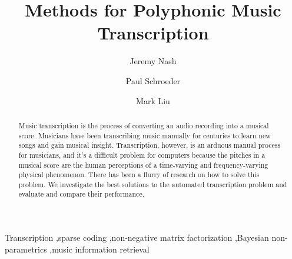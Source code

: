 \documentclass[5p]{elsarticle}
\begin{document}
\begin{frontmatter}

%
\title{Methods for Polyphonic Music Transcription} %
\author[eadd]{Jeremy Nash}
\author[eadd]{Paul Schroeder}
\address[eadd]{Electrical Engineering Department, University of Michigan, Ann Arbor, MI 48109}
\author[csadd]{Mark Liu}
\address[csadd]{Computer Science Department, University of Michigan, Ann Arbor, MI 48109}










%

\begin{abstract}


Music transcription is the process of converting an audio recording into a musical score. 
Musicians have been transcribing music manually for centuries to learn new songs and gain musical insight.
Transcription, however, is an arduous manual process for musicians, and it's a difficult problem for computers because the pitches in a musical score are the human perceptions of a time-varying and frequency-varying physical phenomenon. 
There has been a flurry of research on how to solve this problem. 
We investigate the best solutions to the automated transcription problem and evaluate and compare their performance.







\end{abstract}
\begin{keyword}
Transcription \sep sparse coding \sep non-negative matrix factorization \sep Bayesian non-parametrics \sep music information retrieval
\end{keyword}

\end{frontmatter}
\end{document}

